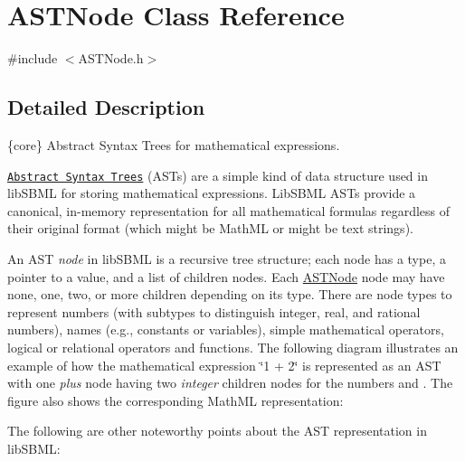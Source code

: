 \hypertarget{class_a_s_t_node}{}\section{A\+S\+T\+Node Class Reference}
\label{class_a_s_t_node}


{\ttfamily \#include $<$A\+S\+T\+Node.\+h$>$}



\subsection{Detailed Description}
\{core\} Abstract Syntax Trees for mathematical expressions.



\href{http://en.wikipedia.org/wiki/Abstract_syntax_tree}{\tt Abstract Syntax Trees} (A\+S\+Ts) are a simple kind of data structure used in lib\+S\+B\+ML for storing mathematical expressions. Lib\+S\+B\+ML A\+S\+Ts provide a canonical, in-\/memory representation for all mathematical formulas regardless of their original format (which might be Math\+ML or might be text strings).

\begin{DoxyParagraph}{}
An A\+ST {\itshape node} in lib\+S\+B\+ML is a recursive tree structure; each node has a type, a pointer to a value, and a list of children nodes. Each \hyperlink{class_a_s_t_node}{A\+S\+T\+Node} node may have none, one, two, or more children depending on its type. There are node types to represent numbers (with subtypes to distinguish integer, real, and rational numbers), names (e.\+g., constants or variables), simple mathematical operators, logical or relational operators and functions. The following diagram illustrates an example of how the mathematical expression {\ttfamily \char`\"{}1 + 2\char`\"{}} is represented as an A\+ST with one {\itshape plus} node having two {\itshape integer} children nodes for the numbers {} and {}. The figure also shows the corresponding Math\+ML representation\+:
\end{DoxyParagraph}


The following are other noteworthy points about the A\+ST representation in lib\+S\+B\+ML\+:

